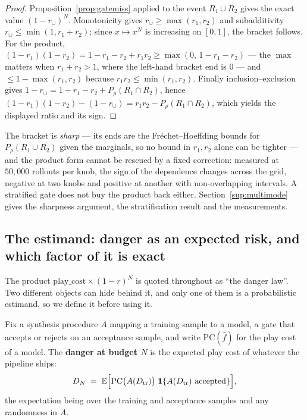 \documentclass[11pt]{article}
\theoremstyle{definition}
\theoremstyle{remark}
\begin{document}
\begin{proof}
Proposition~\ref{prop:gatemiss} applied to the event $R_1 \cup R_2$ gives the exact value $(1-r_\cup)^N$. Monotonicity gives $r_\cup \geq \max(r_1,r_2)$ and subadditivity $r_\cup \leq \min(1, r_1+r_2)$; since $x \mapsto x^N$ is increasing on $[0,1]$, the bracket follows. For the product, $(1-r_1)(1-r_2) = 1 - r_1 - r_2 + r_1 r_2 \geq \max(0,\, 1 - r_1 - r_2)$ --- the $\max$ matters when $r_1 + r_2 > 1$, where the left-hand bracket end is $0$ --- and $\leq 1 - \max(r_1,r_2)$ because $r_1 r_2 \leq \min(r_1,r_2)$. Finally inclusion--exclusion gives $1 - r_\cup = 1 - r_1 - r_2 + P_\rho(R_1 \cap R_2)$, hence $(1-r_1)(1-r_2) - (1-r_\cup) = r_1 r_2 - P_\rho(R_1 \cap R_2)$, which yields the displayed ratio and its sign.
\end{proof}

The bracket is \emph{sharp} --- its ends are the Fr\'echet--Hoeffding bounds for $P_\rho(R_1 \cup R_2)$ given the marginals, so no bound in $r_1, r_2$ alone can be tighter --- and the product form cannot be rescued by a fixed correction: measured at $50{,}000$ rollouts per knob, the sign of the dependence changes across the grid, negative at two knobs and positive at another with non-overlapping intervals. A stratified gate does not buy the product back either. Section~\ref{sup:multimode} gives the sharpness argument, the stratification result and the measurements.

\subsection{The estimand: danger as an expected risk, and which factor of it is exact}
\label{sec:estimand}

The product $\mathrm{play\_cost} \times (1-r)^N$ is quoted throughout as ``the danger law''. Two different objects can hide behind it, and only one of them is a probabilistic estimand, so we define it before using it.

Fix a synthesis procedure $A$ mapping a training sample to a model, a gate that accepts or rejects on an acceptance sample, and write $\mathrm{PC}(\hat f)$ for the play cost of a model. The \textbf{danger at budget $N$} is the expected play cost of whatever the pipeline ships:
\[
  D_N \;=\; \mathbb{E}\Bigl[\mathrm{PC}\bigl(A(D_{\mathrm{tr}})\bigr)\;\mathbf 1\{A(D_{\mathrm{tr}}) \text{ accepted}\}\Bigr],
\]
the expectation being over the training and acceptance samples and any randomness in $A$.
\end{document}

